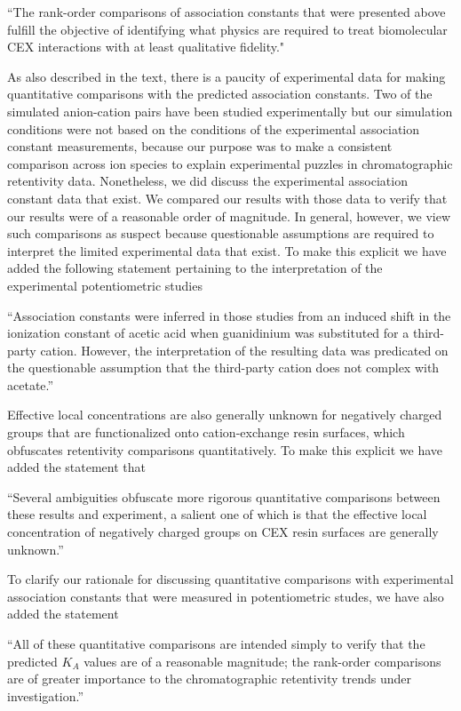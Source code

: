 \documentclass[answers,12pt]{exam}
\begin{document}
\begin{questions}
\begin{solution}
    ``The rank-order comparisons of association constants that were presented above fulfill the objective of identifying what physics are required to treat biomolecular CEX interactions with at least qualitative fidelity."

    As also described in the text, there is a paucity of experimental data for making quantitative comparisons with the predicted association constants. Two of the simulated anion-cation pairs have been studied experimentally but our simulation conditions were not based on the conditions of the experimental association constant measurements, because our purpose was to make a consistent comparison across ion species to explain experimental puzzles in chromatographic retentivity data. Nonetheless, we did discuss the experimental association constant data that exist. We compared our results with those data to verify that our results were of a reasonable order of magnitude. In general, however, we view such comparisons as suspect because questionable assumptions are required to interpret the limited experimental data that exist. To make this explicit we have added the following statement pertaining to the interpretation of the experimental potentiometric studies

    ``Association constants were inferred in those studies from an induced shift in the ionization constant of acetic acid when guanidinium was substituted for a third-party cation. However, the interpretation of the resulting data was predicated on the questionable assumption that the third-party cation does not complex with acetate.''
    
    Effective local concentrations are also generally unknown for negatively charged groups that are functionalized onto cation-exchange resin surfaces, which obfuscates retentivity comparisons quantitatively. To make this explicit we have added the statement that 
    
    ``Several ambiguities obfuscate more rigorous quantitative comparisons between these results and experiment, a salient one of which is that the effective local concentration of negatively charged groups on CEX resin surfaces are generally unknown.'' 
    
    To clarify our rationale for discussing quantitative comparisons with experimental association constants that were measured in potentiometric studes, we have also added the statement

    ``All of these quantitative comparisons are intended simply to verify that the predicted $K_A$ values are of a reasonable magnitude; the rank-order comparisons are of greater importance to the chromatographic retentivity trends under investigation.''


\end{solution}
\end{questions}
\end{document}
